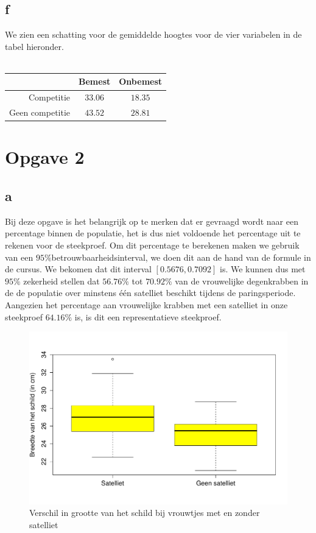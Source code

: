 \documentclass[11pt, a4paper]{article}
\begin{document}
\subsection*{f}
We zien een schatting voor de gemiddelde hoogtes voor de vier variabelen in de tabel hieronder.\\ \\
\begin{tabular}{r|c|c}
&Bemest&Onbemest\\
\hline
Competitie&$33.06$&$18.35$\\
\hline
Geen competitie&$43.52$&$28.81$\\
\end{tabular}
\section*{Opgave 2}
\subsection*{a}
Bij deze opgave is het belangrijk op te merken dat er gevraagd wordt naar een percentage binnen de populatie, het is dus niet voldoende het percentage uit te rekenen voor de steekproef. Om dit percentage te berekenen maken we gebruik van een $95\%$betrouwbaarheidsinterval, we doen dit aan de hand van de formule in de cursus. We bekomen dat dit interval $[0.5676, 0.7092]$ is. We kunnen dus met $95\%$ zekerheid stellen dat $56.76\%$ tot $70.92\%$ van de vrouwelijke degenkrabben in de de populatie over minstens \'e\'en satelliet beschikt tijdens de paringsperiode. Aangezien het percentage aan vrouwelijke krabben met een satelliet in onze steekproef $64.16\%$ is, is dit een representatieve steekproef.

\begin{figure}
	\begin{center}		
		\vspace{-1cm}
		\includegraphics[scale=0.45]{box_b.pdf}
		\caption{Verschil in grootte van het schild bij vrouwtjes met en zonder satelliet}
		\label{boxb}
	\end{center}
\end{figure}
\end{document}

